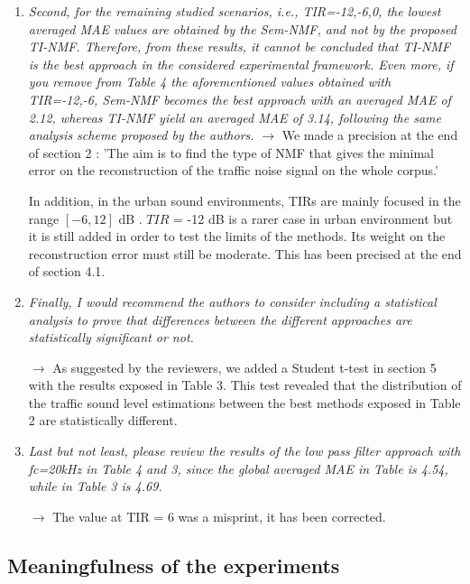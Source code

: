 \documentclass[10pt]{article}
\begin{document}
\begin{enumerate}
\item \emph{Second, for the remaining studied scenarios, i.e., TIR={-12,-6,0}, the lowest averaged MAE values are obtained by the Sem-NMF, and not by the proposed TI-NMF.
Therefore, from these results, it cannot be concluded that TI-NMF is the best approach in the considered experimental framework. Even more, if you remove from Table 4 the aforementioned values obtained with TIR={-12,-6}, Sem-NMF becomes the best approach with an averaged MAE of 2.12, whereas TI-NMF yield an averaged MAE of 3.14, following the same analysis scheme proposed by the authors.}
$\rightarrow$ We made a precision at the end of section 2 : 'The aim is to find the type of NMF that gives the minimal error on the reconstruction of the traffic noise signal on the whole corpus.'

In addition, in the urban sound environments, TIRs are mainly focused in the range $\left[-6, 12\right]$ dB \cite{gloaguen_creation_2017}. 
$TIR$ = -12 dB is a rarer case in urban environment but it is still added in order to test the limits of the methods.  Its weight on the reconstruction error must still be moderate. This has been precised at the end of section 4.1.


\item \emph{Finally, I would recommend the authors to consider including a statistical analysis to prove that differences between the different approaches are statistically significant or not.}

$\rightarrow$ As suggested by the reviewers, we added a Student t-test in section 5 with the results exposed in Table 3. This test revealed that the distribution of the traffic sound level estimations between the best methods exposed in Table 2 are statistically different.

\item \emph{Last but not least, please review the results of the low pass filter approach with fc=20kHz in Table 4 and 3, since the global averaged MAE in Table is 4.54, while in Table 3 is 4.69.}

$\rightarrow$ The value at TIR = 6 was a misprint, it has been corrected.


\end{enumerate}

\subsection{Meaningfulness of the experiments}
\end{document}
